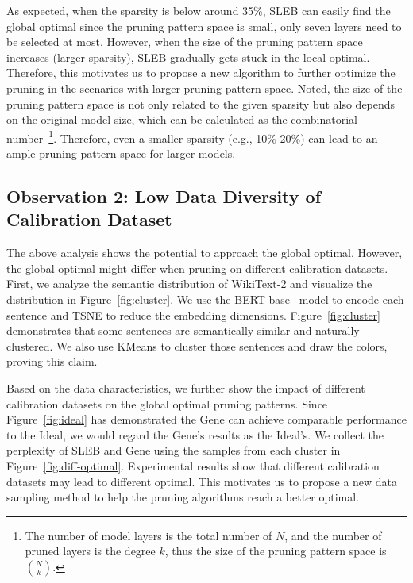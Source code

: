 As expected, when the sparsity is below around 35\%, SLEB can easily find the global optimal %
since the pruning pattern space is small, only seven layers need to be selected at most.
However, when the size of the pruning pattern space increases (larger sparsity), SLEB gradually gets stuck in the local optimal.
Therefore, this motivates us to propose a new algorithm to further optimize the pruning in the scenarios with larger pruning pattern space. 
Noted, the size of the pruning pattern space is not only related to the given sparsity but also depends on the original model size, which can be calculated as the combinatorial number~\footnote{The number of model layers is the total number of $N$, and the number of pruned layers is the degree $k$, thus the size of the pruning pattern space is $\binom{N}{k}$.}. 
Therefore, even a smaller sparsity (e.g., 10\%-20\%) can lead to an ample pruning pattern space for larger models.

\subsection{Observation 2: Low Data Diversity of Calibration Dataset}

The above analysis shows the potential to approach the global optimal.
However, the global optimal might differ when pruning on different calibration datasets.
First, we analyze the semantic distribution of WikiText-2 and visualize the distribution in Figure~\ref{fig:cluster}.
We use the BERT-base~\cite{BERT} model to encode each sentence and TSNE to reduce the embedding dimensions.
Figure~\ref{fig:cluster} demonstrates that some sentences are semantically similar and naturally clustered.
We also use KMeans to cluster those sentences and draw the colors, proving this claim.

Based on the data characteristics, we further show the impact of different calibration datasets on the global optimal pruning patterns.
Since Figure~\ref{fig:ideal} has demonstrated the Gene can achieve comparable performance to the Ideal, we would regard the Gene's results as the Ideal's.
We collect the perplexity of SLEB and Gene using the samples from each cluster in Figure~\ref{fig:diff-optimal}.
Experimental results show that different calibration datasets may lead to different optimal.
This motivates us to propose a new data sampling method to help the pruning algorithms reach a better optimal.
